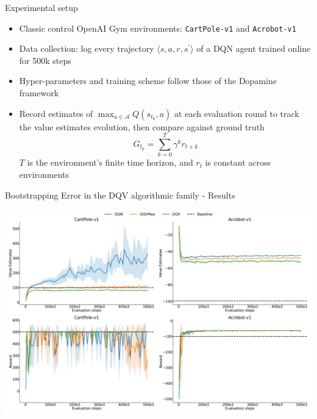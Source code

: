 \documentclass[presentation]{beamer}
\begin{document}
\begin{frame}[label={sec:org40d31b9},fragile]{Experimental setup}
 \begin{itemize}
\item Classic control OpenAI Gym environments: \texttt{CartPole-v1} and
\texttt{Acrobot-v1}
\item Data collection: log every trajectory \(\langle
  s,a,r,s^{\prime}\rangle\) of a DQN\cite{mnih2013playing} agent
trained online for 500k steps
\item Hyper-parameters and training scheme follow those of the
Dopamine\cite{castro18dopamine} framework
\item Record estimates of \(\max_{a \in \mathcal{A}}Q(s_{t_{0}}, a)\) at each
evaluation round to track the value estimates evolution, then compare
against ground truth
$$G_{t_{0}} = \sum_{k=0}^{T}{\gamma^{k}r_{t+k}}$$
\(T\) is the environment's finite time horizon, and \(r_{t}\)
is constant across environments
\end{itemize}
\end{frame}

\begin{frame}[label={sec:org5f884f4}]{Bootstrapping Error in the DQV algorithmic family - Results}
\begin{center}
\includegraphics[width=\textwidth]{./dshift_plots_normal.png}
\end{center}
\end{frame}
\end{document}
